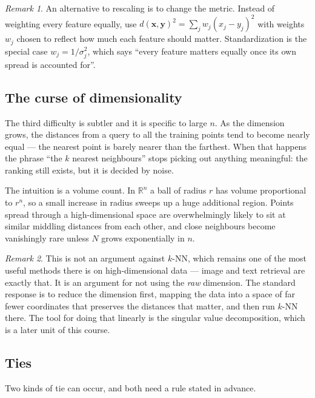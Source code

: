 \documentclass[11pt]{article}
\theoremstyle{plain}
\theoremstyle{definition}
\theoremstyle{remark}
\newtheorem*{rmk}{Remark}
\newcommand{\R}{\mathbb{R}}
\newcommand{\vc}[1]{\mathbf{#1}}
\begin{document}
\begin{rmk}
An alternative to rescaling is to change the metric. Instead of weighting every
feature equally, use
$d(\vc{x},\vc{y})^{2}=\sum_j w_j (x_j-y_j)^{2}$ with weights $w_j$ chosen to
reflect how much each feature should matter. Standardization is the special case
$w_j = 1/\sigma_j^{2}$, which says ``every feature matters equally once its own
spread is accounted for''.
\end{rmk}

\subsection{The curse of dimensionality}
The third difficulty is subtler and it is specific to large $n$. As the
dimension grows, the distances from a query to all the training points tend to
become nearly equal --- the nearest point is barely nearer than the farthest.
When that happens the phrase ``the $k$ nearest neighbours'' stops picking out
anything meaningful: the ranking still exists, but it is decided by noise.

The intuition is a volume count. In $\R^{n}$ a ball of radius $r$ has volume
proportional to $r^{n}$, so a small increase in radius sweeps up a huge
additional region. Points spread through a high-dimensional space are
overwhelmingly likely to sit at similar middling distances from each other, and
close neighbours become vanishingly rare unless $N$ grows exponentially in $n$.

\begin{rmk}
This is not an argument against $k$-NN, which remains one of the most useful
methods there is on high-dimensional data --- image and text retrieval are
exactly that. It is an argument for not using the \emph{raw} dimension. The
standard response is to reduce the dimension first, mapping the data into a
space of far fewer coordinates that preserves the distances that matter, and
then run $k$-NN there. The tool for doing that linearly is the singular value
decomposition, which is a later unit of this course.
\end{rmk}

\subsection{Ties}
Two kinds of tie can occur, and both need a rule stated in advance.
\end{document}
